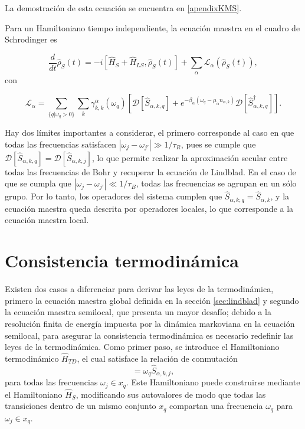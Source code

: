 La demostración de esta ecuación se encuentra en \ref{apendixKMS}.

Para un Hamiltoniano tiempo independiente, la ecuación maestra en el cuadro de Schrodinger es

\begin{equation}
    \frac{d}{dt}\hat{\rho}_{S}(t) = -i [\hat{H}_{S}+ \hat{H}_{LS},\hat{\rho}_{S}(t)] + \sum_{\alpha}\mathcal{L}_{\alpha}(\hat{\rho}_{S}(t)),
\label{sec2schrodingerthermo}
\end{equation}
con

\begin{equation}
    \mathcal{L}_{\alpha} = \sum_{\{q|\omega_{q}>0\}} \sum_{k}\gamma^{\alpha}_{k,k}(\omega_{q}) \left[ \mathcal{D}[\hat{S}_{\alpha,k,q}] + e^{-\beta_{\alpha}(\omega_{q} - \mu_{\alpha}n_{\alpha,k})}\mathcal{D}[\hat{S}^{\dagger}_{\alpha,k,q}]  \right].
\label{sec2lindbladconsistency}
\end{equation}

Hay dos límites importantes a considerar, el primero corresponde al caso en que todas las frecuencias satisfacen $|\omega_{j}-\omega_{j'}| \gg 1/\tau_{R}$, pues se cumple que $\mathcal{D}[\hat{S}_{\alpha,k,q}] = \mathcal{D}[\hat{S}_{\alpha,k,j}]$, lo que permite realizar la aproximación secular entre todas las frecuencias de Bohr y recuperar la ecuación de Lindblad. En el caso de que se cumpla que $|\omega_{j}-\omega_{j'}| \ll 1/\tau_{B}$, todas las frecuencias se agrupan en un sólo grupo. Por lo tanto, los operadores del sistema cumplen que $\hat{S}_{\alpha,k;q} = \hat{S}_{\alpha,k}$, y la ecuación maestra queda descrita por operadores locales, lo que corresponde a la ecuación maestra local\cite{wichterich2007modeling}.
\section{Consistencia termodinámica}
Existen dos casos a diferenciar para derivar las leyes de la termodinámica, primero la ecuación maestra global definida en la sección \ref{sec:lindblad} y segundo la ecuación maestra semilocal, que presenta un mayor desafío; debido a la resolución finita de energía impuesta por la dinámica markoviana en la ecuación semilocal, para asegurar la consistencia termodinámica es necesario redefinir las leyes de la termodinámica. Como primer paso, se introduce el Hamiltoniano termodinámico $\hat{H}_{TD}$, el cual satisface la relación de conmutación
\label{sec2:thermolaws}
\begin{equation*}
    [\hat{S}_{\alpha,k,j},\hat{H}_{TD}] = \omega_{q}\hat{S}_{\alpha,k,j},
\end{equation*}
para todas las frecuencias $\omega_{j} \in x_{q}$. Este Hamiltoniano puede construirse mediante el Hamiltoniano $\hat{H}_{S}$, modificando sus autovalores de modo que todas las transiciones dentro de un mismo conjunto $x_q$ compartan una frecuencia $\omega_{q}$ para $\omega_{j} \in x_{q}$.

